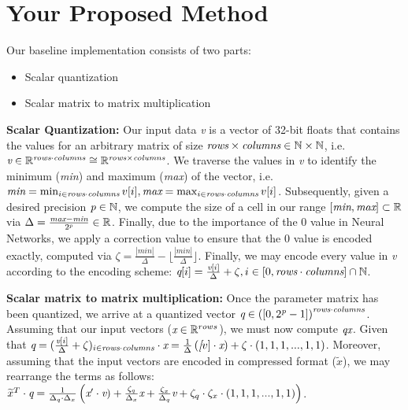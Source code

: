 \section{Your Proposed Method}\label{sec:yourmethod}


Our baseline implementation consists of two parts:
\begin{itemize}
\item Scalar quantization
\item Scalar matrix to matrix multiplication
\end{itemize}

\textbf{Scalar Quantization: } Our input data \emph{v} is a vector of 32-bit floats that contains the values for an arbitrary matrix of size $\emph{rows} \times \emph{columns} \in \mathbb{N} \times \mathbb{N} $, i.e.\ $ \emph{v} \in \mathbb{R}^{ \emph{rows} \cdot \emph{columns} } \cong \mathbb{R}^{ \emph{rows} \times \emph{columns} } $. We traverse the values in \emph{v} to identify the minimum (\emph{min}) and maximum (\emph{max}) of the vector, i.e. $ \emph{min} = \min_{ i \in \emph{rows} \cdot \emph{columns} } v[i] , \emph{max} = \max_{i \in \emph{rows} \cdot \emph{columns} } v[i] $. Subsequently, given a desired precision $ \emph{p} \in \mathbb{N} $, we compute the size of a cell in our range $[\emph{min},\emph{max}] \subset \mathbb{R}$ via $ \Delta = \frac{ \emph{max} - \emph{min} }{ 2^{\emph{p}}} \in \mathbb{R} $. Finally, due to the importance of the 0 value in Neural Networks, we apply a correction value to ensure that the 0 value is encoded exactly, computed via $ \zeta = \frac{ | min | }{ \Delta } - \lfloor \frac{ | min | }{ \Delta } \rfloor $. Finally, we may encode every value in \emph{v} according to the encoding scheme: $ \emph{q}[i] = \frac{ \emph{v}[i] } {\Delta} + \zeta , i \in [0, \emph{rows}\cdot\emph{columns}] \cap \mathbb{N} $.

\textbf{Scalar matrix to matrix multiplication: } Once the parameter matrix has been quantized, we arrive at a quantized vector $ \emph{q} \in  \left([0, 2^{\emph{p}} - 1]\right)^{ \emph{rows} \cdot \emph{columns} }$. Assuming that our input vectors ($ \emph{x} \in \mathbb{R}^{rows} $), we must now compute $ \emph{q} \emph{x} $. Given that $ \emph{q} = ( \frac{ \emph{v}[i] }{ \Delta} + \zeta )_{i \in \emph{rows}\cdot\emph{columns}} \cdot \emph{x} = \frac{1}{\Delta} \left(  \emph[v] \cdot \emph{x} \right) + \zeta \cdot (1,1,1,...,1,1) $. Moreover, assuming that the input vectors are encoded in compressed format ($\widetilde{{x}}$), we may rearrange the terms as follows: 
$ \widetilde{{x}}^{T} \cdot \emph{q} = \frac	{1}{\Delta_q \cdot \Delta_x} \left( \emph{x}' \cdot \emph{v} ) + \frac{\zeta_q}{\Delta_x} \emph{x} + \frac{\zeta_x}{\Delta_q} \emph{v} + \zeta_q \cdot \zeta_x \cdot (1,1,1,...,1,1) \right)$.

